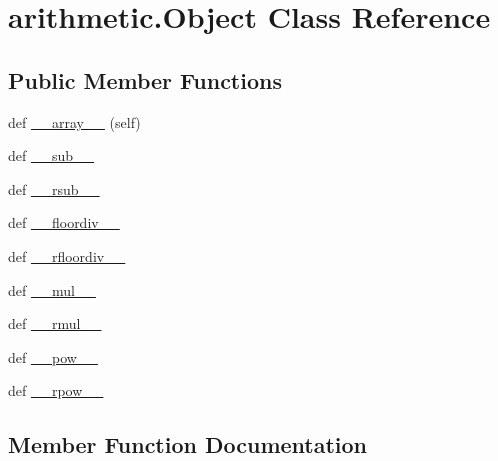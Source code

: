 \hypertarget{classarithmetic_1_1Object}{}\section{arithmetic.\+Object Class Reference}
\label{classarithmetic_1_1Object}
\subsection*{Public Member Functions}
\begin{DoxyCompactItemize}
\item 
def \hyperlink{classarithmetic_1_1Object_a108398481aa80fc7846a8bb377e26b69}{\+\_\+\+\_\+array\+\_\+\+\_\+} (self)
\item 
def \hyperlink{classarithmetic_1_1Object_ab6b4d55b42e08f469575ac0c281753c7}{\+\_\+\+\_\+sub\+\_\+\+\_\+}
\item 
def \hyperlink{classarithmetic_1_1Object_a8d1eb75c8b6bf36295114638f8c6436d}{\+\_\+\+\_\+rsub\+\_\+\+\_\+}
\item 
def \hyperlink{classarithmetic_1_1Object_ab4de4ac4e6f275068826f258b33a590e}{\+\_\+\+\_\+floordiv\+\_\+\+\_\+}
\item 
def \hyperlink{classarithmetic_1_1Object_abb2e1ab800120d3ee826fa6c6b29f5ef}{\+\_\+\+\_\+rfloordiv\+\_\+\+\_\+}
\item 
def \hyperlink{classarithmetic_1_1Object_aa6c366c792484f28e9049aa7c1f9c907}{\+\_\+\+\_\+mul\+\_\+\+\_\+}
\item 
def \hyperlink{classarithmetic_1_1Object_a0fcb46f0a37b11a467a03c2c06fcccbd}{\+\_\+\+\_\+rmul\+\_\+\+\_\+}
\item 
def \hyperlink{classarithmetic_1_1Object_a4bebf28146b396c1886bdd1c84a3f100}{\+\_\+\+\_\+pow\+\_\+\+\_\+}
\item 
def \hyperlink{classarithmetic_1_1Object_a9aeaf30e1feb91ddabdec92d883059b3}{\+\_\+\+\_\+rpow\+\_\+\+\_\+}
\end{DoxyCompactItemize}


\subsection{Member Function Documentation}
\mbox{\label{classarithmetic_1_1Object_a108398481aa80fc7846a8bb377e26b69}} 

